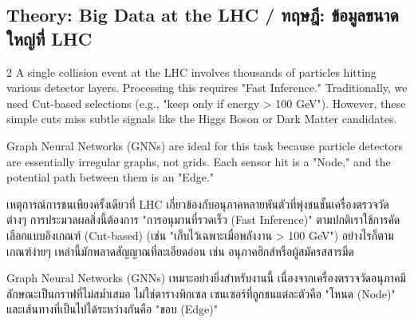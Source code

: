 \subsection{Theory: Big Data at the LHC \quad / \quad \textthai{ทฤษฎี: ข้อมูลขนาดใหญ่ที่ LHC}}
\begin{paracol}{2}
A single collision event at the LHC involves thousands of particles hitting various detector layers. Processing this requires "Fast Inference." Traditionally, we used Cut-based selections (e.g., "keep only if energy > 100 GeV"). However, these simple cuts miss subtle signals like the Higgs Boson or Dark Matter candidates.

Graph Neural Networks (GNNs) are ideal for this task because particle detectors are essentially irregular graphs, not grids. Each sensor hit is a "Node," and the potential path between them is an "Edge."

\switchcolumn

\begin{thai}
เหตุการณ์การชนเพียงครั้งเดียวที่ LHC เกี่ยวข้องกับอนุภาคหลายพันตัวที่พุ่งชนชั้นเครื่องตรวจวัดต่างๆ การประมวลผลสิ่งนี้ต้องการ "การอนุมานที่รวดเร็ว (Fast Inference)" ตามปกติเราใช้การคัดเลือกแบบอิงเกณฑ์ (Cut-based) (เช่น "เก็บไว้เฉพาะเมื่อพลังงาน > 100 GeV") อย่างไรก็ตาม เกณฑ์ง่ายๆ เหล่านี้มักพลาดสัญญาณที่ละเอียดอ่อน เช่น อนุภาคฮิกส์หรือผู้สมัครสสารมืด

Graph Neural Networks (GNNs) เหมาะอย่างยิ่งสำหรับงานนี้ เนื่องจากเครื่องตรวจวัดอนุภาคมีลักษณะเป็นกราฟที่ไม่สม่ำเสมอ ไม่ใช่ตารางพิกเซล เซนเซอร์ที่ถูกชนแต่ละตัวคือ "โหนด (Node)" และเส้นทางที่เป็นไปได้ระหว่างกันคือ "ขอบ (Edge)"
\end{thai}
\end{paracol}
